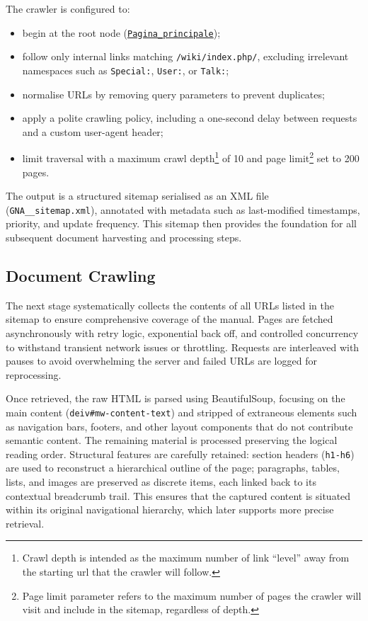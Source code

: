 \begin{spacing}{1.5}
The crawler is configured to:
\begin{itemize}
      \item begin at the root node (\texttt{\href{https://web.archive.org/web/20250803092155/https://gna.cultura.gov.it/wiki/index.php/Pagina_principale}{Pagina\_principale}}\nocite{noauthor_wiki_2025});
      \item follow only internal links matching \texttt{/wiki/index.php/}, excluding irrelevant namespaces such as \texttt{Special:}, \texttt{User:}, or \texttt{Talk:};
      \item normalise URLs by removing query parameters to prevent duplicates;
      \item apply a polite crawling policy, including a one-second delay between requests and a custom user-agent header;
      \item limit traversal with a maximum crawl depth\footnote{Crawl depth is intended as the maximum number of link ``level'' away from the starting url that the crawler will follow.} of 10 and page limit\footnote{Page limit parameter refers to the maximum number of pages the crawler will visit and include in the sitemap, regardless of depth.} set to 200 pages.
\end{itemize}

The output is a structured sitemap serialised as an XML file (\texttt{GNA\_\_sitemap.xml}), annotated with metadata such as last-modified timestamps, priority, and update frequency. This sitemap then provides the foundation for all subsequent document harvesting and processing steps.

\subsection{Document Crawling}
The next stage systematically collects the contents of all URLs listed in the sitemap to ensure comprehensive coverage of the manual. Pages are fetched asynchronously with retry logic, exponential back off, and controlled concurrency to withstand transient network issues or throttling. Requests are interleaved with pauses to avoid overwhelming the server and failed URLs are logged for reprocessing.

Once retrieved, the raw HTML is parsed using BeautifulSoup, focusing on the main content (\texttt{deiv\#mw-content-text}) and stripped of extraneous elements such as navigation bars, footers, and other layout components that do not contribute semantic content. The remaining material is processed preserving the logical reading order. Structural features are carefully retained: section headers (\texttt{h1-h6}) are used to reconstruct a hierarchical outline of the page; paragraphs, tables, lists, and images are preserved as discrete items, each linked back to its contextual breadcrumb trail. This ensures that the captured content is situated within its original navigational hierarchy, which later supports more precise retrieval.


\end{spacing}
